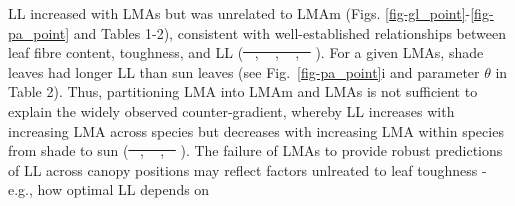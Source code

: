 \documentclass[
  12pt,
  letterpaper,
  DIV=11,
  numbers=noendperiod]{scrartcl}
\providecommand{\DIFadd}[1]{{\protect\color{blue}\uwave{#1}}} %
\providecommand{\DIFdel}[1]{{\protect\color{red}\sout{#1}}}                      %
\providecommand{\DIFaddbegin}{} %
\providecommand{\DIFaddend}{} %
\providecommand{\DIFdelbegin}{} %
\providecommand{\DIFdelend}{} %
\newcommand{\DIFscaledelfig}{0.5}
\newlength{\DIFdelgraphicswidth} %
\newlength{\DIFdelgraphicsheight} %
\newcommand{\DIFaddincludegraphics}[2][]{{\color{blue}\fbox{\DIFOincludegraphics[#1]{#2}}}} %
\newcommand{\DIFdelincludegraphics}[2][]{%
\sbox{\DIFdelgraphicsbox}{\DIFOincludegraphics[#1]{#2}}%
\settoboxwidth{\DIFdelgraphicswidth}{\DIFdelgraphicsbox} %
\settoboxtotalheight{\DIFdelgraphicsheight}{\DIFdelgraphicsbox} %
\scalebox{\DIFscaledelfig}{%
\parbox[b]{\DIFdelgraphicswidth}{\usebox{\DIFdelgraphicsbox}\\[-\baselineskip] \rule{\DIFdelgraphicswidth}{0em}}\llap{\resizebox{\DIFdelgraphicswidth}{\DIFdelgraphicsheight}{%
\setlength{\unitlength}{\DIFdelgraphicswidth}%
\begin{picture}(1,1)%
\thicklines\linethickness{2pt} %
{\color[rgb]{1,0,0}\put(0,0){\framebox(1,1){}}}%
{\color[rgb]{1,0,0}\put(0,0){\line( 1,1){1}}}%
{\color[rgb]{1,0,0}\put(0,1){\line(1,-1){1}}}%
\end{picture}%
}\hspace*{3pt}}} %
} %
\DeclareRobustCommand{\DIFaddbegin}{\DIFOaddbegin \let\includegraphics\DIFaddincludegraphics} %
\DeclareRobustCommand{\DIFaddend}{\DIFOaddend \let\includegraphics\DIFOincludegraphics} %
\DeclareRobustCommand{\DIFdelbegin}{\DIFOdelbegin \let\includegraphics\DIFdelincludegraphics} %
\DeclareRobustCommand{\DIFdelend}{\DIFOaddend \let\includegraphics\DIFOincludegraphics} %
\begin{document}
LL increased with LMAs but was unrelated to LMAm (Figs.
\ref{fig-gl_point}-\ref{fig-pa_point} and Tables 1-2), consistent with
well-established relationships between leaf fibre content, toughness,
and LL (\DIFdelbegin \DIFdel{\mbox{%
\citeproc{ref-Onoda2011}{Onoda et al. 2011}}\hspace{0pt}%
,
\mbox{%
\citeproc{ref-Onoda2017}{2017}}\hspace{0pt}%
,
\mbox{%
\citeproc{ref-Kitajima2012}{Kitajima et
al. 2012}}\hspace{0pt}%
, \mbox{%
\citeproc{ref-Kitajima2016}{2016}}\hspace{0pt}%
}\DIFdelend \DIFaddbegin \DIFadd{\mbox{%
\citeproc{ref-Kitajima2016}{Kitajima et al., 2016}}\hspace{0pt}%
,
\mbox{%
\citeproc{ref-Kitajima2012}{2012}}\hspace{0pt}%
; \mbox{%
\citeproc{ref-Onoda2017}{Onoda et
al., 2017}}\hspace{0pt}%
, \mbox{%
\citeproc{ref-Onoda2011}{2011}}\hspace{0pt}%
}\DIFaddend ). For a given LMAs, shade
leaves had longer LL than sun leaves (see Fig.~\ref{fig-pa_point}i and
parameter \(\theta\) in Table 2). Thus, partitioning LMA into LMAm and
LMAs is not sufficient to explain the widely observed counter-gradient,
whereby LL increases with increasing LMA across species but decreases
with increasing LMA within species from shade to sun
(\DIFdelbegin \DIFdel{\mbox{%
\citeproc{ref-Lusk2008}{Lusk et al. 2008}}\hspace{0pt}%
,
\mbox{%
\citeproc{ref-Russo2016}{Russo and Kitajima 2016}}\hspace{0pt}%
,
\mbox{%
\citeproc{ref-Osnas2018}{Osnas et al. 2018}}\hspace{0pt}%
}\DIFdelend \DIFaddbegin \DIFadd{\mbox{%
\citeproc{ref-Lusk2008}{Lusk et al., 2008}}\hspace{0pt}%
;
\mbox{%
\citeproc{ref-Osnas2018}{Osnas et al., 2018}}\hspace{0pt}%
;
\mbox{%
\citeproc{ref-Russo2016}{Russo and Kitajima, 2016}}\hspace{0pt}%
}\DIFaddend ). The failure of LMAs
to provide robust predictions of LL across canopy positions may reflect
factors unlreated to leaf toughness - e.g., how optimal LL depends on
\end{document}
